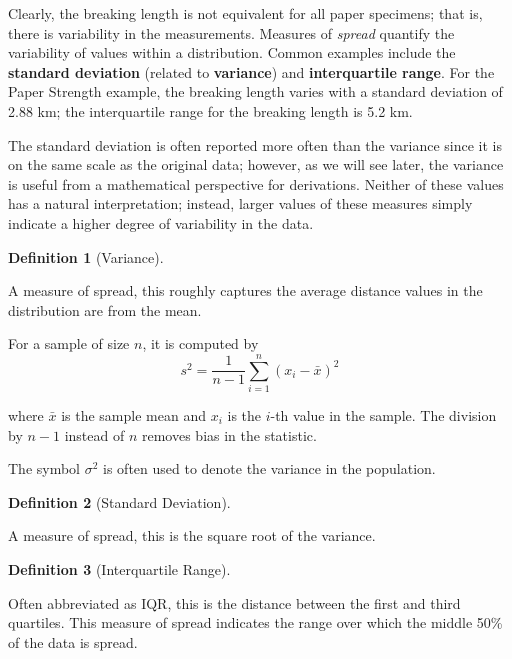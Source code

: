 \documentclass[
  letterpaper,
  DIV=11,
  numbers=noendperiod]{scrreprt}
\theoremstyle{definition}
\newtheorem{definition}{Definition}[chapter]
\theoremstyle{definition}
\theoremstyle{plain}
\theoremstyle{remark}
\begin{document}
Clearly, the breaking length is not equivalent for all paper specimens;
that is, there is variability in the measurements. Measures of
\emph{spread} quantify the variability of values within a distribution.
Common examples include the \textbf{standard deviation} (related to
\textbf{variance}) and \textbf{interquartile range}. For the Paper
Strength example, the breaking length varies with a standard deviation
of 2.88 km; the interquartile range for the breaking length is 5.2 km.

The standard deviation is often reported more often than the variance
since it is on the same scale as the original data; however, as we will
see later, the variance is useful from a mathematical perspective for
derivations. Neither of these values has a natural interpretation;
instead, larger values of these measures simply indicate a higher degree
of variability in the data.

\begin{definition}[Variance]\protect\hypertarget{def-variance}{}\label{def-variance}

A measure of spread, this roughly captures the average distance values
in the distribution are from the mean.

For a sample of size \(n\), it is computed by
\[s^2 = \frac{1}{n-1}\sum_{i=1}^{n} \left(x_i - \bar{x}\right)^2\]

where \(\bar{x}\) is the sample mean and \(x_i\) is the \(i\)-th value
in the sample. The division by \(n-1\) instead of \(n\) removes bias in
the statistic.

The symbol \(\sigma^2\) is often used to denote the variance in the
population.

\end{definition}

\begin{definition}[Standard
Deviation]\protect\hypertarget{def-standard-deviation}{}\label{def-standard-deviation}

A measure of spread, this is the square root of the variance.

\end{definition}

\begin{definition}[Interquartile
Range]\protect\hypertarget{def-interquartile-range}{}\label{def-interquartile-range}

Often abbreviated as IQR, this is the distance between the first and
third quartiles. This measure of spread indicates the range over which
the middle 50\% of the data is spread.

\end{definition}
\end{document}
